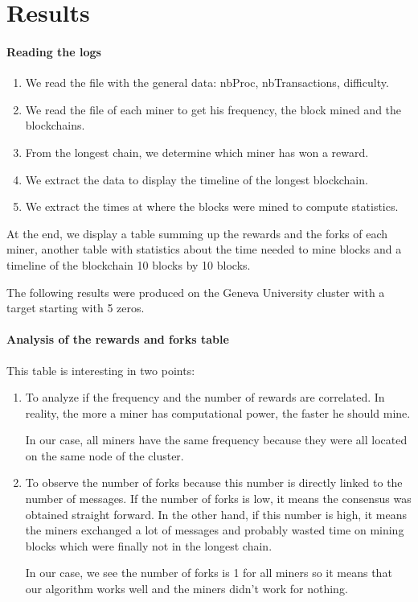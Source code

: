 \section{Results}

\paragraph{Reading the logs}


\begin{enumerate}
  \item We read the file with the general data: nbProc, nbTransactions, difficulty.
  \item We read the file of each miner to get his frequency, the block mined and the blockchains.
  \item From the longest chain, we determine which miner has won a reward.
  \item We extract the data to display the timeline of the longest blockchain.
  \item We extract the times at where the blocks were mined to compute statistics.
\end{enumerate}
\medskip

At the end, we display a table summing up the rewards and the forks of each miner, another table with statistics about the time needed to mine blocks and a timeline of the blockchain 10 blocks by 10 blocks. \newline

The following results were produced on the Geneva University cluster with a target starting with 5 zeros.

\paragraph{Analysis of the rewards and forks table}

This table is interesting in two points: \newline

\begin{enumerate}
  \item To analyze if the frequency and the number of rewards are correlated. In reality, the more a miner has computational power, the faster he should mine. \newline

  In our case, all miners have the same frequency because they were all located on the same node of the cluster.

  \item To observe the number of forks because this number is directly linked to the number of messages. If the number of forks is low, it means the consensus was obtained straight forward. In the other hand, if this number is high, it means the miners exchanged a lot of messages and probably wasted time on mining blocks which were finally not in the longest chain. \newline

  In our case, we see the number of forks is 1 for all miners so it means that our algorithm works well and the miners didn't work for nothing.
\end{enumerate}

